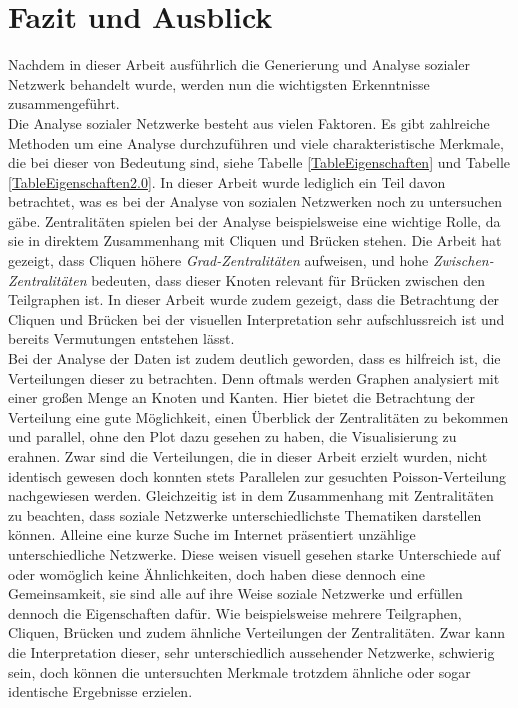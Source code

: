 \chapter{Fazit und Ausblick}\label{ch:fazit}

Nachdem in dieser Arbeit ausführlich die Generierung und Analyse sozialer Netzwerk behandelt wurde, werden nun die wichtigsten Erkenntnisse zusammengeführt. \\
Die Analyse sozialer Netzwerke besteht aus vielen Faktoren. Es gibt zahlreiche Methoden um eine Analyse durchzuführen und viele charakteristische Merkmale, die bei dieser von Bedeutung sind, siehe Tabelle \ref{TableEigenschaften} und Tabelle \ref{TableEigenschaften2.0}. In dieser Arbeit wurde lediglich ein Teil davon betrachtet, was es bei der Analyse von sozialen Netzwerken noch zu untersuchen gäbe. Zentralitäten spielen bei der Analyse beispielsweise eine wichtige Rolle, da sie in direktem Zusammenhang mit Cliquen und Brücken stehen. Die Arbeit hat gezeigt, dass Cliquen höhere \textit{Grad-Zentralitäten} aufweisen, und hohe \textit{Zwischen-Zentralitäten} bedeuten, dass dieser Knoten relevant für Brücken zwischen den Teilgraphen ist. In dieser Arbeit wurde zudem gezeigt, dass die Betrachtung der Cliquen und Brücken bei der visuellen Interpretation sehr aufschlussreich ist und bereits Vermutungen entstehen lässt. \\

Bei der Analyse der Daten ist zudem deutlich geworden, dass es hilfreich ist, die Verteilungen dieser zu betrachten. Denn oftmals werden Graphen analysiert mit einer großen Menge an Knoten und Kanten. Hier bietet die Betrachtung der Verteilung eine gute Möglichkeit, einen Überblick der Zentralitäten zu bekommen und parallel, ohne den Plot dazu gesehen zu haben, die Visualisierung zu erahnen. 
Zwar sind die Verteilungen, die in dieser Arbeit erzielt wurden, nicht identisch gewesen doch konnten stets Parallelen zur gesuchten Poisson-Verteilung nachgewiesen werden.
Gleichzeitig ist in dem Zusammenhang mit Zentralitäten zu beachten, dass soziale Netzwerke unterschiedlichste Thematiken darstellen können. Alleine eine kurze Suche im Internet präsentiert unzählige unterschiedliche Netzwerke. Diese weisen visuell gesehen starke Unterschiede auf oder womöglich keine Ähnlichkeiten, doch haben diese dennoch eine Gemeinsamkeit, sie sind alle auf ihre Weise soziale Netzwerke und erfüllen dennoch die Eigenschaften dafür. Wie beispielsweise mehrere Teilgraphen, Cliquen, Brücken und zudem ähnliche Verteilungen der Zentralitäten. Zwar kann die Interpretation dieser, sehr unterschiedlich aussehender Netzwerke, schwierig sein, doch können die untersuchten Merkmale trotzdem ähnliche oder sogar identische Ergebnisse erzielen. \\

